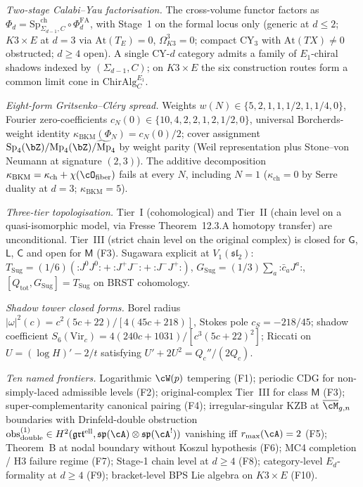 \emph{Two-stage Calabi--Yau factorisation.} The cross-volume functor
factors as
$\Phi_d = \mathrm{Sp}^{\mathrm{ch}}_{\Sigma_{d-1},C}\circ\Phi^{\mathrm{FA}}_d$,
with Stage~1 on the formal locus only (generic at $d\le 2$;
$K3\times E$ at $d=3$ via $\mathrm{At}(T_E)=0$, $\Omega^3_{K3}=0$;
compact CY$_3$ with $\mathrm{At}(TX)\neq 0$ obstructed; $d\ge 4$
open). A single CY-$d$ category admits a family of $E_1$-chiral
shadows indexed by $(\Sigma_{d-1},C)$; on $K3\times E$ the six
construction routes form a common limit cone in
$\mathrm{ChirAlg}^{E_1}_C$.

\emph{Eight-form Gritsenko--Cl\'ery spread.} Weights
$w(N)\in\{5,2,1,1,1/2,1,1/4,0\}$, Fourier zero-coefficients
$c_N(0)\in\{10,4,2,2,1,2,1/2,0\}$, universal Borcherds-weight
identity $\kappa_{\mathrm{BKM}}(\Phi_N)=c_N(0)/2$; cover assignment
$\mathrm{Sp}_4(\bZ)/\mathrm{Mp}_4(\bZ)/\widetilde{\mathrm{Mp}}_4$ by
weight parity (Weil representation plus Stone--von Neumann at
signature $(2,3)$). The additive decomposition
$\kappa_{\mathrm{BKM}}=\kappa_{\mathrm{ch}}+\chi(\cO_{\mathrm{fiber}})$
fails at every $N$, including $N=1$ ($\kappa_{\mathrm{ch}}=0$ by
Serre duality at $d=3$; $\kappa_{\mathrm{BKM}}=5$).

\emph{Three-tier topologisation.} Tier~I (cohomological) and
Tier~II (chain level on a quasi-isomorphic model, via Fresse
Theorem~12.3.A homotopy transfer) are unconditional. Tier~III
(strict chain level on the original complex) is closed for
$\mathsf G$, $\mathsf L$, $\mathsf C$ and open for $\mathsf M$ (F3).
Sugawara explicit at $V_1(\mathfrak{sl}_2)$:
$T_{\mathrm{Sug}}=(1/6)(\mathord{:}J^0J^0\mathord{:}
+\mathord{:}J^+J^-\mathord{:}+\mathord{:}J^-J^+\mathord{:})$,
$G_{\mathrm{Sug}}=(1/3)\sum_a\mathord{:}\bar c_a J^a\mathord{:}$,
$[Q_{\mathrm{tot}},G_{\mathrm{Sug}}]=T_{\mathrm{Sug}}$ on BRST
cohomology.

\emph{Shadow tower closed forms.} Borel radius
$|\omega|^2(c)=c^2(5c+22)/[4(45c+218)]$, Stokes pole $c_S=-218/45$;
shadow coefficient
$S_6(\mathrm{Vir}_c)=4(240c+1031)/[c^3(5c+22)^2]$; Riccati on
$U=(\log H)'-2/t$ satisfying $U'+2U^2=Q_c''/(2Q_c)$.

\emph{Ten named frontiers.} Logarithmic $\cW(p)$ tempering (F1);
periodic CDG for non-simply-laced admissible levels (F2);
original-complex Tier~III for class $\mathsf M$ (F3);
super-complementarity canonical pairing (F4); irregular-singular KZB
at $\overline{\cM}_{g,n}$ boundaries with Drinfeld-double
obstruction $\mathrm{obs}^{(1)}_{\mathrm{double}}\in
H^2(\mathfrak{grt}^{\mathrm{ell}},\mathfrak{sp}(\cA)\otimes\mathfrak{sp}(\cA^!))$
vanishing iff $r_{\max}(\cA)=2$ (F5); Theorem~B at nodal boundary
without Koszul hypothesis (F6); MC4 completion / H3 failure regime
(F7); Stage-1 chain level at $d\ge 4$ (F8); category-level
$E_d$-formality at $d\ge 4$ (F9); bracket-level BPS Lie algebra on
$K3\times E$ (F10).

